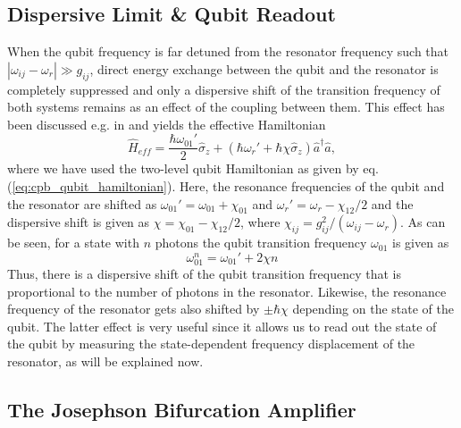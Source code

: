\subsection{Dispersive Limit \& Qubit Readout}

When the qubit frequency is far detuned from the resonator frequency such that $|\omega_{ij}-\omega_r| \gg g_{ij}$, direct energy exchange between the qubit and the resonator is completely suppressed and only a dispersive shift of the transition frequency of both systems remains as an effect of the coupling between them. This effect has been discussed e.g. in \cite{koch_charge-insensitive_2007} and yields the effective Hamiltonian
%
\begin{equation}
\hat{H}_{eff} = \frac{\hbar\omega_{01}'}{2}\hat{\sigma}_z+(\hbar\omega_r'+\hbar \chi \hat{\sigma}_z)\hat{a}^\dagger \hat{a}, \label{eq:dispersive_interaction}
\end{equation}
%
where we have used the two-level qubit Hamiltonian as given by eq. (\ref{eq:cpb_qubit_hamiltonian}). Here, the resonance frequencies of the qubit and the resonator are shifted as $\omega_{01}'=\omega_{01}+\chi_{01}$ and $\omega_r' = \omega_{r}-\chi_{12}/2$ and the dispersive shift is given as $\chi=\chi_{01}-\chi_{12}/2$, where $\chi_{ij}=g_{ij}^2/(\omega_{ij}-\omega_r)$. As can be seen, for a state with $n$ photons the qubit transition frequency $\omega_{01}$ is given as
%
\begin{equation}
\omega_{01}^n = \omega_{01}'+2\chi n
\end{equation}
%
Thus, there is a dispersive shift of the qubit transition frequency that is proportional to the number of photons in the resonator. Likewise, the resonance frequency of the resonator gets also shifted by $\pm\hbar\chi$ depending on the state of the qubit. The latter effect is very useful since it allows us to read out the state of the qubit by measuring the state-dependent frequency displacement of the resonator, as will be explained now.

\subsection{The Josephson Bifurcation Amplifier}

